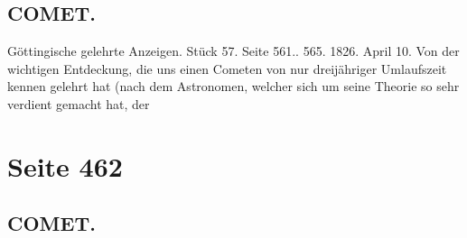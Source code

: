 \documentclass[10pt,a4paper]{article}
\begin{document}
\subsection*{COMET.}

Göttingische  gelehrte  Anzeigen.  Stück  57.  Seite  561.. 565.     1826.  April  10.
Von  der  wichtigen  Entdeckung,  die  uns  einen  Cometen  von  nur  dreijähriger  Umlaufszeit  kennen
gelehrt  hat  (nach  dem  Astronomen,  welcher  sich  um  seine  Theorie  so  sehr  verdient   gemacht  hat,   der

\newpage
\section*{Seite 462}

\subsection*{COMET.}
\end{document}
